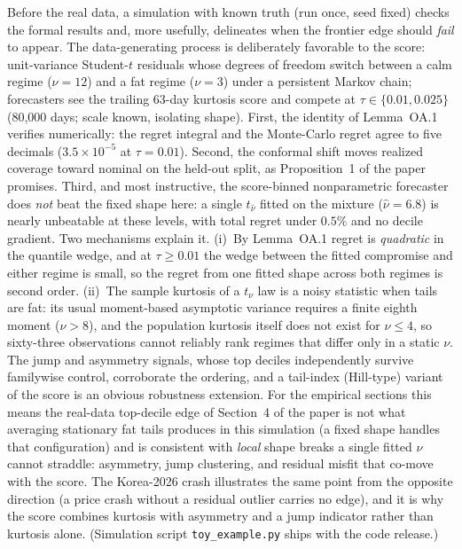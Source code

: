 \documentclass[11pt]{article}
\begin{document}
Before the real data, a simulation with known truth (run once, seed
fixed) checks the formal results and, more usefully, delineates when
the frontier edge should \emph{fail} to appear. The data-generating
process is deliberately favorable to the score: unit-variance
Student-$t$ residuals whose degrees of freedom switch between a calm
regime ($\nu=12$) and a fat regime ($\nu=3$) under a persistent Markov
chain; forecasters see the trailing 63-day kurtosis score and compete
at $\tau \in \{0.01, 0.025\}$ (80{,}000 days; scale known, isolating
shape). First, the identity of Lemma~OA.1
verifies numerically: the regret integral and the Monte-Carlo regret
agree to five decimals ($3.5\times10^{-5}$ at $\tau=0.01$). Second, the
conformal shift moves realized coverage toward nominal on the held-out
split, as Proposition~1 of the paper promises. Third, and most instructive, the score-binned nonparametric
forecaster does
\emph{not} beat the fixed shape here: a single $t_{\widehat\nu}$
fitted on the mixture ($\widehat\nu = 6.8$) is nearly unbeatable at
these levels, with total regret under $0.5\%$ and no decile gradient.
Two mechanisms explain it. (i)~By
Lemma~OA.1 regret is \emph{quadratic} in the quantile
wedge, and at $\tau \ge 0.01$ the wedge between the fitted compromise
and either regime is small, so the regret from one fitted shape across
both regimes is second order. (ii)~The sample kurtosis of a $t_\nu$ law is a noisy statistic when
tails are fat: its usual moment-based asymptotic variance requires a
finite eighth moment ($\nu>8$), and the population kurtosis itself does
not exist for $\nu\le4$, so sixty-three observations cannot reliably
rank regimes that differ only in a static $\nu$. The jump and
asymmetry signals, whose top deciles independently survive familywise
control, corroborate the ordering, and a tail-index (Hill-type)
variant of the score is an obvious robustness extension. For the empirical sections this means the real-data top-decile edge of Section~4 of the paper
is not what averaging stationary fat tails produces in this
simulation (a fixed shape handles that configuration) and is consistent with \emph{local} shape breaks a single
fitted $\nu$ cannot straddle: asymmetry, jump clustering, and residual misfit
that co-move with the score. The Korea-2026 crash illustrates the same point from the opposite direction (a price crash without a residual outlier carries no edge), and it is why the score combines
kurtosis with asymmetry and a jump indicator rather than kurtosis
alone. (Simulation script \texttt{toy\_example.py} ships with the code
release.)
\end{document}
